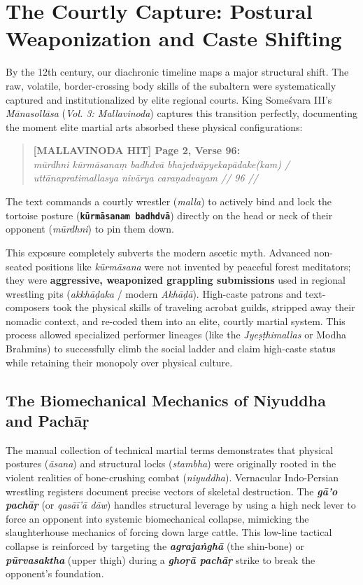 \documentclass[11pt,letterpaper]{article}
\begin{document}
\section{The Courtly Capture: Postural Weaponization and Caste Shifting}
By the 12th century, our diachronic timeline maps a major structural shift. The raw, volatile, border-crossing body skills of the subaltern were systematically captured and institutionalized by elite regional courts. King Someśvara III's \textit{Mānasollāsa} (\textit{Vol. 3: Mallavinoda}) captures this transition perfectly, documenting the moment elite martial arts absorbed these physical configurations:

\begin{quotation}
\noindent \textbf{[MALLAVINODA HIT] Page 2, Verse 96:} \\
\textit{mūrdhni kūrmāsanaṃ badhdvā bhajedvāpyekapādake(kam) / uttānapratimallasya nivārya caraṇadvayam // 96 //}
\end{quotation}

The text commands a courtly wrestler (\textit{malla}) to actively bind and lock the tortoise posture (\textbf{\texttt{kūrmāsanam badhdvā}}) directly on the head or neck of their opponent (\textit{mūrdhni}) to pin them down. 

This exposure completely subverts the modern ascetic myth. Advanced non-seated positions like \textit{kūrmāsana} were not invented by peaceful forest meditators; they were \textbf{aggressive, weaponized grappling submissions} used in regional wrestling pits (\textit{akkhāḍaka} / modern \textit{Akhāḍā}). High-caste patrons and text-composers took the physical skills of traveling acrobat guilds, stripped away their nomadic context, and re-coded them into an elite, courtly martial system. This process allowed specialized performer lineages (like the \textit{Jyeṣṭhimallas} or Modha Brahmins) to successfully climb the social ladder and claim high-caste status while retaining their monopoly over physical culture.

\subsection{The Biomechanical Mechanics of Niyuddha and Pachāṛ}
The manual collection of technical martial terms demonstrates that physical postures (\textit{āsana}) and structural locks (\textit{stambha}) were originally rooted in the violent realities of bone-crushing combat (\textit{niyuddha}). Vernacular Indo-Persian wrestling registers document precise vectors of skeletal destruction. The \textbf{\textit{gā’o pachāṛ}} (or \textit{qasāī’ā dāw}) handles structural leverage by using a high neck lever to force an opponent into systemic biomechanical collapse, mimicking the slaughterhouse mechanics of forcing down large cattle. This low-line tactical collapse is reinforced by targeting the \textbf{\textit{agrajaṅghā}} (the shin-bone) or \textbf{\textit{pūrvasaktha}} (upper thigh) during a \textbf{\textit{ghoṛā pachāṛ}} strike to break the opponent's foundation. 
\end{document}
